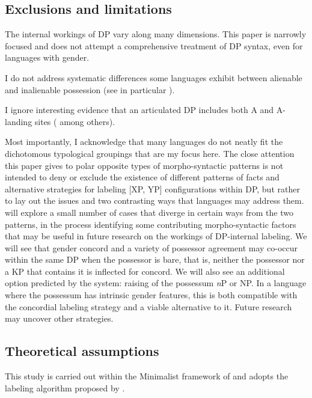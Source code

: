 \documentclass[output=paper
,modfonts
,nonflat]{langsci/langscibook}
\begin{document}
\subsection{Exclusions and limitations} \label{sec-carstens:1.3}
The internal workings of DP vary along many dimensions. This paper is narrowly focused and does not attempt a comprehensive treatment of DP syntax, even for languages with gender.

I do not address systematic differences some languages exhibit between alienable and inalienable possession (see in particular \citealt{Den_Dikken2015}).     

I ignore interesting evidence that an articulated DP includes both A\textquotesingle{} and A-landing sites (\citealt{Szabolcsi1983,Gavruseva2000,Alexiadou2001,Haegeman2004} among others).    

Most importantly, I acknowledge that many languages do not neatly fit the dichotomous typological groupings that are my focus here. The close attention this paper gives to polar opposite types of morpho-syntactic patterns is not intended to deny or exclude the existence of different patterns of facts and alternative strategies for labeling [XP, YP] configurations within DP, but rather to lay out the issues and two contrasting ways that languages may address them.  will explore a small number of cases that diverge in certain ways from the two patterns, in the process identifying some contributing morpho-syntactic factors that may be useful in future research on the workings of DP-internal labeling. We will see that gender concord and a variety of possessor agreement may co-occur within the same DP when the possessor is bare, that is, neither the possessor nor a KP that contains it is inflected for concord. We will also see an additional option predicted by the system: raising of the possessum \textit{n}P or NP. In a language where the possessum has intrinsic gender features, this is both compatible with the concordial labeling strategy and a viable alternative to it. Future research may uncover other strategies.    

\subsection{Theoretical assumptions} \label{sec-carstens:1.4}
This study is carried out within the Minimalist framework of \citet{Chomsky2000, Chomsky2001} and adopts the labeling algorithm proposed by \citet{Chomsky2013, Chomsky2015}. 
\end{document}
